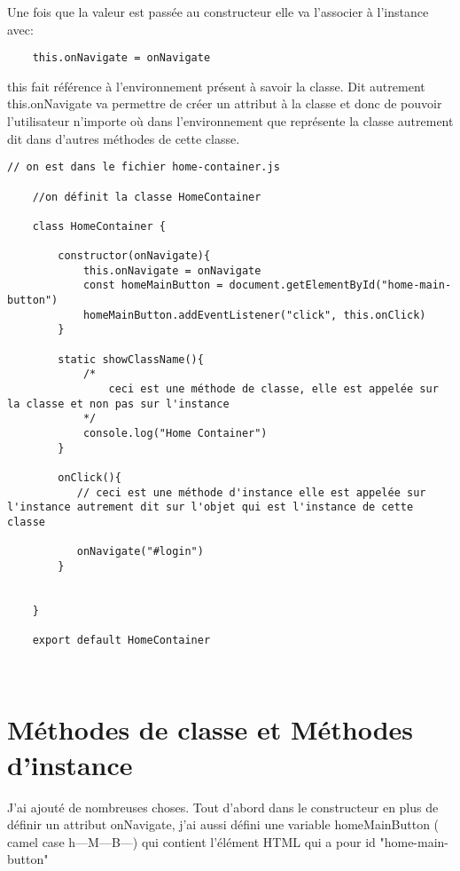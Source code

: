 \documentclass[a4paper, 12pt]{report}
\begin{document}
Une fois que la valeur est passée au constructeur elle va l'associer à l'instance 
avec:

\begin{verbatim}
    this.onNavigate = onNavigate
\end{verbatim}

this fait référence à l'environnement présent à savoir la classe. Dit autrement this.onNavigate va permettre de créer un attribut à la classe et donc de pouvoir l'utilisateur n'importe où dans l'environnement que représente la classe autrement dit dans d'autres méthodes de cette classe.



\begin{lstlisting}[style=mainlststyle]
    // on est dans le fichier home-container.js
    
    //on définit la classe HomeContainer 
    
    class HomeContainer {
    
        constructor(onNavigate){
            this.onNavigate = onNavigate 
            const homeMainButton = document.getElementById("home-main-button")
            homeMainButton.addEventListener("click", this.onClick)
        }

        static showClassName(){
            /* 
                ceci est une méthode de classe, elle est appelée sur la classe et non pas sur l'instance 
            */
            console.log("Home Container")
        }

        onClick(){
           // ceci est une méthode d'instance elle est appelée sur l'instance autrement dit sur l'objet qui est l'instance de cette classe 
           
           onNavigate("#login")
        }
        
    
    }

    export default HomeContainer
    
    
\end{lstlisting}

\section{Méthodes de classe et Méthodes d'instance}

J'ai ajouté de nombreuses choses. Tout d'abord dans le constructeur en plus de définir un attribut onNavigate, j'ai aussi défini une variable homeMainButton ( camel case h---M---B---) qui contient l'élément HTML qui a pour id "home-main-button"
\end{document}
